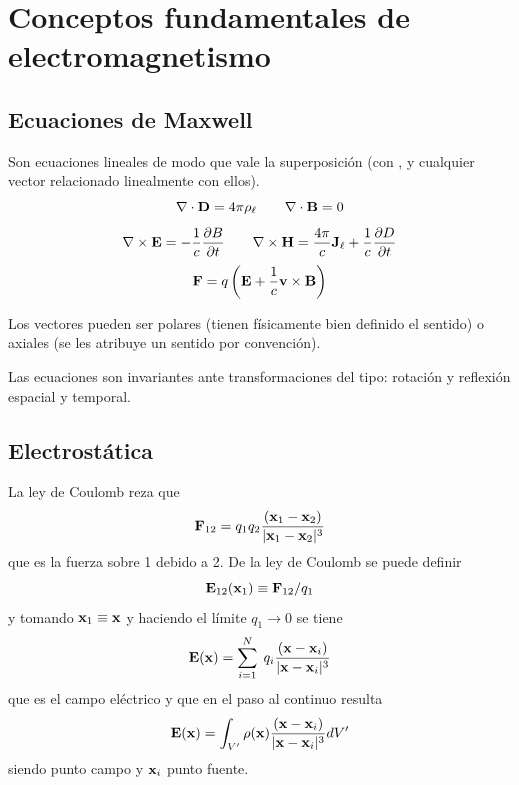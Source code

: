 \documentclass[10pt,oneside]{CBFT_book}
\begin{document}
\chapter{Conceptos fundamentales de electromagnetismo}


\section{Ecuaciones de Maxwell}

Son ecuaciones lineales de modo que vale la superposición (con ,  y 
cualquier vector relacionado linealmente con ellos).
\[
	\nabla \cdot \vb{D} = 4 \pi \rho_\ell \qquad \nabla \cdot \vb{B} = 0
\]
\[
	\nabla \times \vb{E} = - \frac{1}{c} \dpar{B}{t} \qquad \nabla \times \vb{H} =
	\frac{4\pi}{c} \vb{J}_\ell + \frac{1}{c}\dpar{D}{t}
\]
\[
	\vb{F} = q \left( \vb{E} + \frac{1}{c} \vb{v} \times \vb{B} \right)
\]

Los vectores pueden ser polares (tienen físicamente bien definido el sentido) o
axiales (se les atribuye un sentido por convención).

Las ecuaciones son invariantes ante transformaciones del tipo: rotación
y reflexión espacial y temporal.

\section{Electrostática}

La ley de Coulomb reza que
\[
	\vb{F}_{12} = q_1 q_2 \frac{(\vb{x}_1 - \vb{x}_2)}{|\vb{x}_1 - \vb{x}_2 |^3}
\]
que es la fuerza sobre 1 debido a 2. De la ley de Coulomb se puede definir 
\[
	\vb{E}_{12}(\vb{x}_1) \equiv \vb{F}_{12}/q_1
\]
y tomando $\vb{x}_1 \equiv \vb{x}$ y haciendo el límite $q_1 \to 0$ se tiene
\[
	\vb{E}(\vb{x}) = \sum_{i=1}^N \; q_i \frac{(\vb{x} - \vb{x}_i)}{|\vb{x} - \vb{x}_i |^3}
\]
que es el campo eléctrico y que en el paso al continuo resulta
\[
	\vb{E}(\vb{x}) = \int_{V'} \rho(\vb{x}) \frac{(\vb{x} - \vb{x}_i)}{|\vb{x} - \vb{x}_i |^3} dV' 
\]
siendo  punto campo y $\vb{x}_i$ punto fuente.
\end{document}
